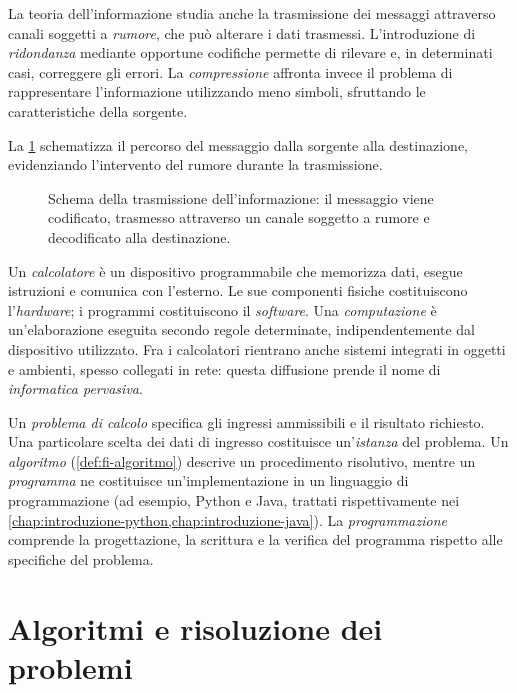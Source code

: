 \clearpage

La teoria dell'informazione studia anche la trasmissione dei messaggi
attraverso canali soggetti a \emph{rumore}, che può alterare i dati
trasmessi. L'introduzione di \emph{ridondanza} mediante opportune
codifiche permette di rilevare e, in determinati casi, correggere
gli errori. La \emph{compressione} affronta invece il problema di
rappresentare l'informazione utilizzando meno simboli, sfruttando
le caratteristiche della sorgente.

La \cref{fig:fi-trasmissione-informazione} schematizza il percorso
del messaggio dalla sorgente alla destinazione, evidenziando
l'intervento del rumore durante la trasmissione.

\begin{figure}[htbp]
  \centering
  \resizebox{\linewidth}{!}{%
  }
  \caption{Schema della trasmissione dell'informazione: il messaggio
  viene codificato, trasmesso attraverso un canale soggetto a rumore
  e decodificato alla destinazione.}
  \label{fig:fi-trasmissione-informazione}
\end{figure}

Un \emph{calcolatore} è un dispositivo programmabile che memorizza dati,
esegue istruzioni e comunica con l'esterno. Le sue componenti fisiche
costituiscono l'\emph{hardware}; i programmi costituiscono il
\emph{software}. Una \emph{computazione} è un'elaborazione eseguita
secondo regole determinate, indipendentemente dal dispositivo utilizzato.
Fra i calcolatori rientrano anche sistemi integrati in oggetti e
ambienti, spesso collegati in rete: questa diffusione prende il nome di
\emph{informatica pervasiva}.

Un \emph{problema di calcolo} specifica gli ingressi ammissibili e il
risultato richiesto. Una particolare scelta dei dati di ingresso
costituisce un'\emph{istanza} del problema. Un \emph{algoritmo}
(\cref{def:fi-algoritmo}) descrive un procedimento risolutivo, mentre
un \emph{programma} ne costituisce un'implementazione in un linguaggio
di programmazione (ad esempio, Python e Java, trattati rispettivamente
nei \cref{chap:introduzione-python,chap:introduzione-java}).
La \emph{programmazione} comprende la progettazione, la scrittura e la
verifica del programma rispetto alle specifiche del problema.

\section{Algoritmi e risoluzione dei problemi}
\label{sec:fi-algoritmi}

